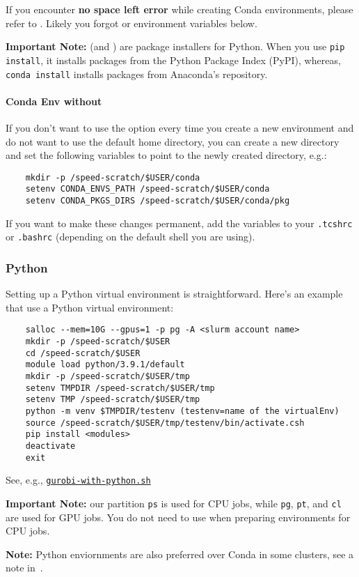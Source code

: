 \noindent If you encounter \textbf{no space left error} while creating Conda environments, please refer to
.
Likely you forgot  or environment variables below.

\textbf{Important Note:}  (and ) are package installers for Python. When you use
\texttt{pip install}, it installs packages from the Python Package Index (PyPI), whereas,
\texttt{conda install} installs packages from Anaconda's repository.

\paragraph{Conda Env without }

If you don't want to use the  option every time you create a new environment and
do not want to use the default home directory, you can create a new directory and set the following
variables to point to the newly created directory, e.g.:
\begin{verbatim}
    mkdir -p /speed-scratch/$USER/conda
    setenv CONDA_ENVS_PATH /speed-scratch/$USER/conda
    setenv CONDA_PKGS_DIRS /speed-scratch/$USER/conda/pkg
\end{verbatim}

\noindent If you want to make these changes permanent, add the variables to your \texttt{.tcshrc}
or \texttt{.bashrc} (depending on the default shell you are using).


\subsubsection{Python}
\label{sect:python-venv}

Setting up a Python virtual environment is straightforward.
Here's an example that use a Python virtual environment:

\begin{verbatim}
    salloc --mem=10G --gpus=1 -p pg -A <slurm account name>
    mkdir -p /speed-scratch/$USER
    cd /speed-scratch/$USER
    module load python/3.9.1/default
    mkdir -p /speed-scratch/$USER/tmp
    setenv TMPDIR /speed-scratch/$USER/tmp
    setenv TMP /speed-scratch/$USER/tmp
    python -m venv $TMPDIR/testenv (testenv=name of the virtualEnv)
    source /speed-scratch/$USER/tmp/testenv/bin/activate.csh
    pip install <modules>
    deactivate
    exit
\end{verbatim}

\noindent See, e.g.,
\href{https://github.com/NAG-DevOps/speed-hpc/blob/master/src/gurobi-with-python.sh}
{\texttt{gurobi-with-python.sh}}

\noindent\textbf{Important Note:} our partition \texttt{ps} is used for CPU jobs, while \texttt{pg},
\texttt{pt}, and \texttt{cl} are used for GPU jobs. You do not need to use 
when preparing environments for CPU jobs.

\noindent\textbf{Note:} Python enviornments are also preferred over Conda
in some clusters, see a note in~.